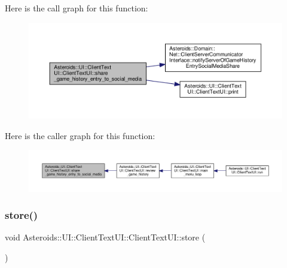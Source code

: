 Here is the call graph for this function\+:
\nopagebreak
\begin{figure}[H]
\begin{center}
\leavevmode
\includegraphics[width=350pt]{classAsteroids_1_1UI_1_1ClientTextUI_1_1ClientTextUI_ab0a3f9e22046b77a85dc7771d3502365_cgraph}
\end{center}
\end{figure}
Here is the caller graph for this function\+:
\nopagebreak
\begin{figure}[H]
\begin{center}
\leavevmode
\includegraphics[width=350pt]{classAsteroids_1_1UI_1_1ClientTextUI_1_1ClientTextUI_ab0a3f9e22046b77a85dc7771d3502365_icgraph}
\end{center}
\end{figure}
\mbox{\label{classAsteroids_1_1UI_1_1ClientTextUI_1_1ClientTextUI_ae228a731be242ef0cf88005c2c03acee}} 
\subsubsection{\texorpdfstring{store()}{store()}}
{\footnotesize\ttfamily void Asteroids\+::\+U\+I\+::\+Client\+Text\+U\+I\+::\+Client\+Text\+U\+I\+::store (\begin{DoxyParamCaption}{ }\end{DoxyParamCaption})\hspace{0.3cm}{\ttfamily [private]}}



